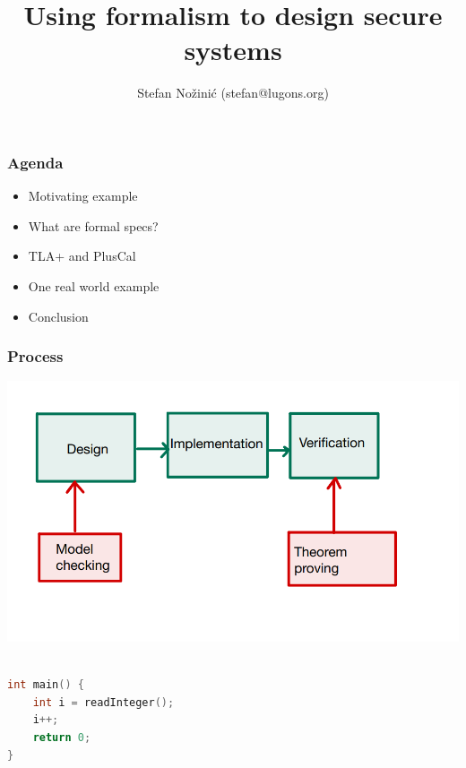 \documentclass{beamer}
\begin{document}
\title{Using formalism to design secure systems}
\author{Stefan Nožinić (stefan@lugons.org)}

\frame{
\titlepage
}

\begin{frame}
    \frametitle{Agenda}
    \begin{itemize}
        \item Motivating example
        \item What are formal specs? 
        \item TLA+ and PlusCal
        \item One real world example
        \item Conclusion
    \end{itemize}

\end{frame}


\begin{frame}
    \frametitle{Process}
    \includegraphics[width=\textwidth]{img/2.png}
\end{frame}

\begin{frame}[fragile]
	\begin{lstlisting}[language=C++]

int main() {
    int i = readInteger();
    i++;
    return 0;
}

	\end{lstlisting}
	
\end{frame}
\end{document}
